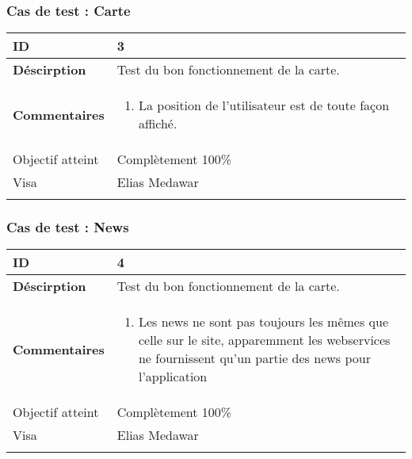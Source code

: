 		 		 \subsubsection*{Cas de test : Carte}
		 		 		 \begin{longtable}{m{4cm}|p{10cm}|}
		 		 		 \textbf{ ID} & 3 \\
		 		 		 \hline \textbf{Déscirption} &  Test du bon fonctionnement de la carte.\\
		 		 		 \hline \textbf{Commentaires} &  
		 		 		 	 	 \begin{enumerate}
	 		 		 		 	 		\item La position de l'utilisateur est de toute façon affiché.
	 		 		 		 	\end{enumerate} \\
	 		 		 		  				\hline Objectif atteint & {\color{green} Complètement  100\% \CheckedBox } \\
	 		 		 		  				\hline Visa & Elias Medawar 	\\
		 		 		 \\
		 		 \end{longtable} 
		 		 \subsubsection*{Cas de test : News}
		 		 		 		 		 \begin{longtable}{m{4cm}|p{10cm}|}
		 		 		 		 		 \textbf{ ID} & 4 \\
		 		 		 		 		 \hline \textbf{Déscirption} &  Test du bon fonctionnement de la carte.\\
		 		 		 		 		 \hline \textbf{Commentaires} &  
		 		 		 		 		 	 	 \begin{enumerate}
		 		 	 		 		 		 	 		\item Les news ne sont pas toujours les mêmes que celle sur le site, apparemment les webservices ne fournissent qu'un partie des news pour l'application
		 		 	 		 					 	\end{enumerate} \\
		 		 	 		 		 		  				\hline Objectif atteint & {\color{green} Complètement 100\% \CheckedBox } \\
		 		 	 		 		 		  				\hline Visa & Elias Medawar 	\\
		 		 		 		 		 \\
		 		 		 		 \end{longtable} 
